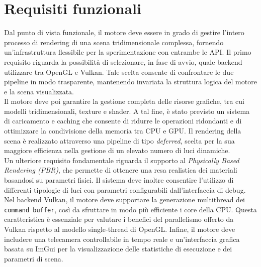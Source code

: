 \documentclass[12pt,a4paper,openright,twoside]{book}
\begin{document}
\section{Requisiti funzionali}
Dal punto di vista funzionale, il motore deve essere in grado di gestire l'intero processo di rendering di una
scena tridimensionale complessa, fornendo un'infrastruttura flessibile per la sperimentazione con entrambe le API.
Il primo requisito riguarda la possibilità di selezionare, in fase di avvio, quale backend utilizzare tra OpenGL e
Vulkan. Tale scelta consente di confrontare le due pipeline in modo trasparente, mantenendo invariata la struttura
logica del motore e la scena visualizzata. \\
Il motore deve poi garantire la gestione completa delle risorse grafiche, tra cui modelli tridimensionali, texture e
shader. A tal fine, è stato previsto un sistema di caricamento e caching che consente di ridurre le operazioni ridondanti
e di ottimizzare la condivisione della memoria tra CPU e GPU. Il rendering della scena è realizzato attraverso una
pipeline di tipo \emph{deferred}, scelta per la sua maggiore efficienza nella gestione di un elevato numero di luci
dinamiche. \\
Un ulteriore requisito fondamentale riguarda il supporto al \emph{Physically Based Rendering (PBR)}, che permette
di ottenere una resa realistica dei materiali basandosi su parametri fisici. Il sistema deve inoltre consentire
l'utilizzo di differenti tipologie di luci con parametri configurabili dall'interfaccia di debug. \\
Nel backend Vulkan, il motore deve supportare la generazione multithread dei \texttt{command buffer}, così da sfruttare
in modo più efficiente i core della CPU. Questa caratteristica è essenziale per valutare i benefici del parallelismo
offerto da Vulkan rispetto al modello single-thread di OpenGL. Infine, il motore deve includere una telecamera
controllabile in tempo reale e un'interfaccia grafica basata su ImGui per la visualizzazione delle statistiche di
esecuzione e dei parametri di scena.
\end{document}
